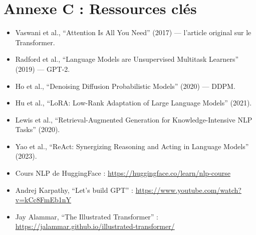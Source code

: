 \documentclass[12pt,a4paper,twoside]{book}
\begin{document}
\chapter*{Annexe C : Ressources cl\'es}

\begin{itemize}
  \item Vaswani et al., ``Attention Is All You Need'' (2017) --- l'article original sur le Transformer.
  \item Radford et al., ``Language Models are Unsupervised Multitask Learners'' (2019) --- GPT-2.
  \item Ho et al., ``Denoising Diffusion Probabilistic Models'' (2020) --- DDPM.
  \item Hu et al., ``LoRA: Low-Rank Adaptation of Large Language Models'' (2021).
  \item Lewis et al., ``Retrieval-Augmented Generation for Knowledge-Intensive NLP Tasks'' (2020).
  \item Yao et al., ``ReAct: Synergizing Reasoning and Acting in Language Models'' (2023).
  \item Cours NLP de HuggingFace : \url{https://huggingface.co/learn/nlp-course}
  \item Andrej Karpathy, ``Let's build GPT'' : \url{https://www.youtube.com/watch?v=kCc8FmEb1nY}
  \item Jay Alammar, ``The Illustrated Transformer'' : \url{https://jalammar.github.io/illustrated-transformer/}
\end{itemize}




\printindex
\end{document}
